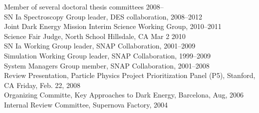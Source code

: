 \documentclass[line, margin]{res}
\begin{document}
\begin{resume}
Member of several doctoral thesis committees 2008--\\
SN Ia Spectroscopy Group leader, DES collaboration, 2008--2012\\
Joint Dark Energy Mission Interim Science Working Group, 2010--2011\\
Science Fair Judge, North School Hillsdale, CA Mar 2 2010\\
SN Ia Working Group leader, SNAP Collaboration, 2001--2009\\
Simulation Working Group leader, SNAP Collaboration, 1999--2009\\
System Managers Group member, SNAP Collaboration, 2001--2008\\
Review Presentation, Particle Physics Project Prioritization Panel (P5), Stanford, CA Friday, Feb. 22, 2008\\
Organizing Committe, Key Approaches to Dark Energy, Barcelona,  Aug, 2006\\
Internal Review Committee, Supernova Factory, 2004


\end{resume}
\end{document}
